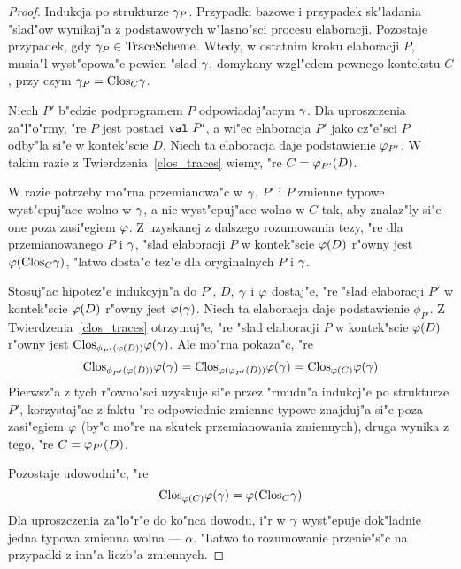 \begin{proof}
Indukcja po strukturze $\gamma_P$.
Przypadki bazowe i przypadek sk"ladania "slad"ow wynikaj"a z podstawowych w"lasno"sci procesu elaboracji.
Pozostaje przypadek, gdy $\gamma_P \in \mbox{TraceScheme}$.
Wtedy, w ostatnim kroku elaboracji $P$, musia"l wyst"epowa"c pewien "slad $\gamma$, 
domykany wzgl"edem pewnego kontekstu $C$, przy czym $\gamma_P = {\rm Clos}_{C}\gamma$.

Niech $P'$ b"edzie podprogramem $P$ odpowiadaj"acym $\gamma$.
Dla uproszczenia za"l"o"rmy, "re $P$ jest postaci ${\tt val}\ P'$,
a wi"ec elaboracja $P'$ jako cz"e"sci $P$ odby"la si"e w kontek"scie $D$.
Niech ta elaboracja daje podstawienie $\varphi_{P'}$.
W takim razie z Twierdzenia~\ref{clos_traces} wiemy, "re $C = \varphi_{P'}(D)$.

W razie potrzeby mo"rna przemianowa"c w $\gamma$, $P'$ i $P$
zmienne typowe wyst"epuj"ace wolno w $\gamma$, a nie wyst"epuj"ace wolno w $C$ tak, 
aby znalaz"ly si"e one poza zasi"egiem $\varphi$.
Z uzyskanej z dalszego rozumowania tezy, "re dla przemianowanego $P$ i $\gamma$, 
"slad elaboracji $P$ w kontek"scie $\varphi(D)$ r"owny jest $\varphi({\rm Clos}_{C}\gamma)$,
"latwo dosta"c tez"e dla oryginalnych $P$ i $\gamma$.

Stosuj"ac hipotez"e indukcyjn"a do $P'$, $D$, $\gamma$ i $\varphi$ dostaj"e,
"re "slad elaboracji $P'$ w kontek"scie $\varphi(D)$ r"owny jest $\varphi(\gamma)$.
Niech ta elaboracja daje podstawienie $\phi_{P'}$.
Z Twierdzenia~\ref{clos_traces} otrzymuj"e, "re "slad elaboracji $P$ 
w kontek"scie $\varphi(D)$ r"owny jest ${\rm Clos}_{\phi_{P'}(\varphi(D))}\varphi(\gamma)$. Ale mo"rna pokaza"c, "re
$$
{\rm Clos}_{\phi_{P'}(\varphi(D))}\varphi(\gamma) = {\rm Clos}_{\varphi(\varphi_{P'}(D))}\varphi(\gamma) = {\rm Clos}_{\varphi(C)}\varphi(\gamma)
$$
Pierwsz"a z tych r"owno"sci uzyskuje si"e przez "rmudn"a indukcj"e po strukturze $P'$,
korzystaj"ac z faktu "re odpowiednie zmienne typowe znajduj"a si"e poza zasi"egiem $\varphi$
(by"c mo"re na skutek przemianowania zmiennych), druga wynika z tego, "re $C = \varphi_{P'}(D)$.

Pozostaje udowodni"c, "re 
$${\rm Clos}_{\varphi(C)}\varphi(\gamma) = \varphi({\rm Clos}_{C}\gamma)$$
Dla uproszczenia za"lo"r"e do ko"nca dowodu, 
i"r w $\gamma$ wyst"epuje dok"ladnie jedna typowa zmienna wolna --- $\alpha$.
"Latwo to rozumowanie przenie"s"c 
na przypadki z inn"a liczb"a zmiennych.


\end{proof}
